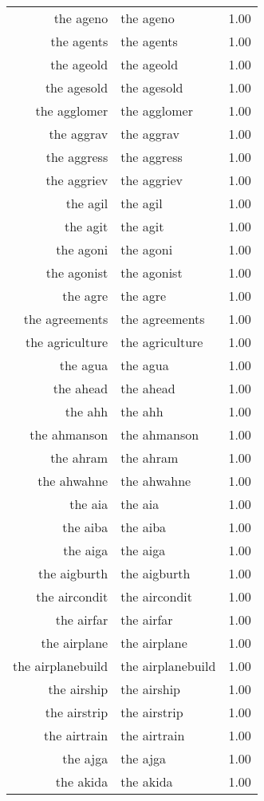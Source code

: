 \begin{table}[ht]
\begin{tabular}{rlr}
  the ageno & the ageno & 1.00 \\ 
  the agents & the agents & 1.00 \\ 
  the ageold & the ageold & 1.00 \\ 
  the agesold & the agesold & 1.00 \\ 
  the agglomer & the agglomer & 1.00 \\ 
  the aggrav & the aggrav & 1.00 \\ 
  the aggress & the aggress & 1.00 \\ 
  the aggriev & the aggriev & 1.00 \\ 
  the agil & the agil & 1.00 \\ 
  the agit & the agit & 1.00 \\ 
  the agoni & the agoni & 1.00 \\ 
  the agonist & the agonist & 1.00 \\ 
  the agre & the agre & 1.00 \\ 
  the agreements & the agreements & 1.00 \\ 
  the agriculture & the agriculture & 1.00 \\ 
  the agua & the agua & 1.00 \\ 
  the ahead & the ahead & 1.00 \\ 
  the ahh & the ahh & 1.00 \\ 
  the ahmanson & the ahmanson & 1.00 \\ 
  the ahram & the ahram & 1.00 \\ 
  the ahwahne & the ahwahne & 1.00 \\ 
  the aia & the aia & 1.00 \\ 
  the aiba & the aiba & 1.00 \\ 
  the aiga & the aiga & 1.00 \\ 
  the aigburth & the aigburth & 1.00 \\ 
  the aircondit & the aircondit & 1.00 \\ 
  the airfar & the airfar & 1.00 \\ 
  the airplane & the airplane & 1.00 \\ 
  the airplanebuild & the airplanebuild & 1.00 \\ 
  the airship & the airship & 1.00 \\ 
  the airstrip & the airstrip & 1.00 \\ 
  the airtrain & the airtrain & 1.00 \\ 
  the ajga & the ajga & 1.00 \\ 
  the akida & the akida & 1.00 \\ 

\end{tabular}
\end{table}
